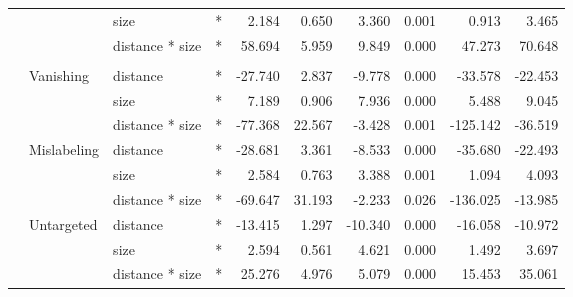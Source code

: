 \begin{longtable}[t]{llllrrrrrr}
\cmidrule{3-10}\nopagebreak
\hspace{1em} &  & size & * & 2.184 & 0.650 & 3.360 & 0.001 & 0.913 & 3.465\\
\cmidrule{3-10}\nopagebreak
\hspace{1em} &  & distance * size & * & 58.694 & 5.959 & 9.849 & 0.000 & 47.273 & 70.648\\
\cmidrule{1-10}\pagebreak[0]
\addlinespace[0.3em]
\multicolumn{10}{l}{\textbf{Cascade R-CNN}}\\
\hspace{1em} & Vanishing & distance & * & -27.740 & 2.837 & -9.778 & 0.000 & -33.578 & -22.453\\
\cmidrule{3-10}\nopagebreak
\hspace{1em} &  & size & * & 7.189 & 0.906 & 7.936 & 0.000 & 5.488 & 9.045\\
\cmidrule{3-10}\nopagebreak
\hspace{1em} &  & distance * size & * & -77.368 & 22.567 & -3.428 & 0.001 & -125.142 & -36.519\\
\cmidrule{2-10}\nopagebreak
\hspace{1em} & Mislabeling & distance & * & -28.681 & 3.361 & -8.533 & 0.000 & -35.680 & -22.493\\
\cmidrule{3-10}\nopagebreak
\hspace{1em} &  & size & * & 2.584 & 0.763 & 3.388 & 0.001 & 1.094 & 4.093\\
\cmidrule{3-10}\nopagebreak
\hspace{1em} &  & distance * size & * & -69.647 & 31.193 & -2.233 & 0.026 & -136.025 & -13.985\\
\cmidrule{2-10}\nopagebreak
\hspace{1em} & Untargeted & distance & * & -13.415 & 1.297 & -10.340 & 0.000 & -16.058 & -10.972\\
\cmidrule{3-10}\nopagebreak
\hspace{1em} &  & size & * & 2.594 & 0.561 & 4.621 & 0.000 & 1.492 & 3.697\\
\cmidrule{3-10}\nopagebreak
\hspace{1em} &  & distance * size & * & 25.276 & 4.976 & 5.079 & 0.000 & 15.453 & 35.061\\
\bottomrule
\end{longtable}
\endgroup{}

